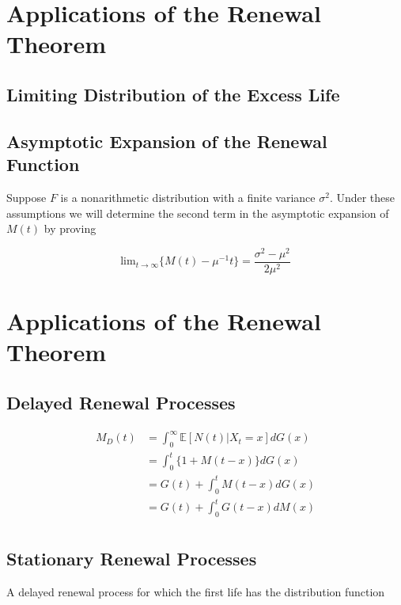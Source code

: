 \documentclass[12pt]{article}
\theoremstyle{nonumberbreak}
\begin{document}
\section{Applications of the Renewal Theorem}

\subsection{Limiting Distribution of the Excess Life}



\subsection{Asymptotic Expansion of the Renewal Function}

Suppose $F$ is a nonarithmetic distribution with a finite variance $\sigma^2$. Under these assumptions we will determine the second term in the asymptotic expansion of $M(t)$ by proving

$$
\mathrm{lim}_{t\to\infty} \{ M(t) - \mu^{-1}t \} = \frac{\sigma^2 - \mu^2}{2\mu^2}
$$



\section{Applications of the Renewal Theorem}

\subsection{Delayed Renewal Processes}

$$
\begin{aligned}
M_D(t) &= \int_0^\infty \mathbb{E}[N(t) | X_t = x ] dG(x) \\[8pt]
&= \int_0^t \{ 1 + M(t-x) \} dG(x) \\[8pt]
&= G(t) + \int_0^t M(t-x) dG(x) \\[8pt]
&= G(t) + \int_0^t G(t-x) dM(x) \\[8pt]
\end{aligned}
$$



\subsection{Stationary Renewal Processes}

A delayed renewal process for which the first life has the distribution
function
\end{document}
